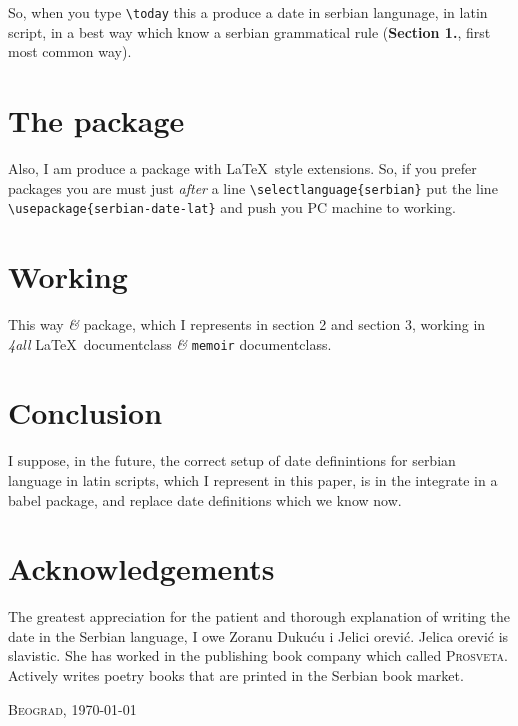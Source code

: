 \documentclass[a4paper,12pt]{article}
\begin{document}
So, when you type \verb|\today| this a produce a date in serbian langunage, in 
latin script, in a best way which know a serbian grammatical rule 
(\textbf{Section 1.}, first most common way).  

\section{The package}

Also, I am produce a package with \LaTeX\ style extensions. So, if you prefer packages
you are must just \textit{after} a line \verb|\selectlanguage{serbian}| put the line 
\verb|\usepackage{serbian-date-lat}| and push you PC machine to working.

\section{Working}

This way \textit{\&} package, which I represents in section 2 and section 3, working 
in \textit{4all} \LaTeX\ documentclass \textit{\&} \verb|memoir| documentclass.

\section{Conclusion}

I suppose, in the future, the correct setup of date definintions for serbian 
language in latin scripts, which I represent in this paper, is in the integrate 
in a babel package, and replace date definitions which we know now.  

\section{Acknowledgements}

The greatest appreciation for the patient and thorough explanation of writing 
the date in the Serbian language, I owe Zoranu Duku\'{c}u i Jelici {\DJ}or{\dj}evi\'{c}. 
Jelica {\DJ}or{\dj}evi\'{c} is slavistic. She has worked in the publishing book company
which called \textsc{Prosveta}. Actively writes poetry books that are printed in the Serbian book market.

\begin{flushleft}
\textsc{Beograd}, \today
\end{flushleft} 
\end{document}
